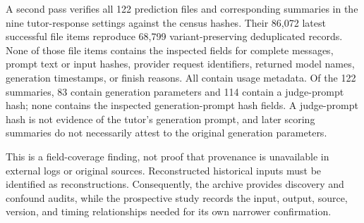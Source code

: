 A second pass verifies all 122 prediction files and corresponding summaries in
the nine tutor-response settings against the census hashes. Their 86,072 latest
successful file items reproduce 68,799 variant-preserving deduplicated records.
None of those file items contains the inspected fields for complete messages,
prompt text or input hashes, provider request identifiers, returned model names,
generation timestamps, or finish reasons. All contain usage metadata. Of the
122 summaries, 83 contain generation parameters and 114 contain a judge-prompt
hash; none contains the inspected generation-prompt hash fields. A judge-prompt
hash is not evidence of the tutor's generation prompt, and later scoring summaries
do not necessarily attest to the original generation parameters.

This is a field-coverage finding, not proof that provenance is unavailable in
external logs or original sources. Reconstructed historical inputs must be
identified as reconstructions. Consequently, the archive provides discovery and
confound audits, while the prospective study records the input, output, source,
version, and timing relationships needed for its own narrower confirmation.
